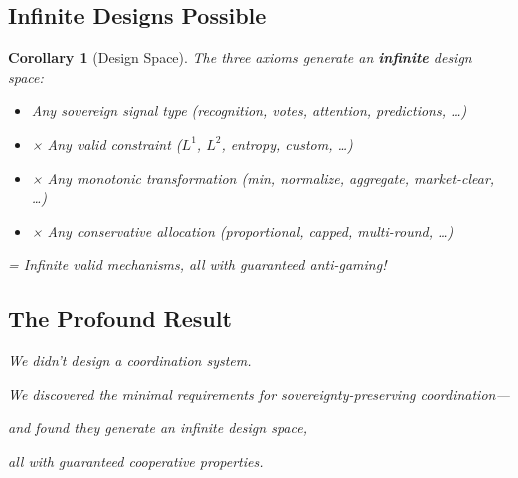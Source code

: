\documentclass[11pt,a4paper]{article}
\newtheorem{corollary}[theorem]{Corollary}
\theoremstyle{definition}
\theoremstyle{remark}
\begin{document}
\subsection{Infinite Designs Possible}

\begin{corollary}[Design Space]
The three axioms generate an \textbf{infinite} design space:
\begin{itemize}
\item Any sovereign signal type (recognition, votes, attention, predictions, …)
\item × Any valid constraint ($L^1$, $L^2$, entropy, custom, …)
\item × Any monotonic transformation (min, normalize, aggregate, market-clear, …)
\item × Any conservative allocation (proportional, capped, multi-round, …)
\end{itemize}

= Infinite valid mechanisms, all with guaranteed anti-gaming!
\end{corollary}

\subsection{The Profound Result}

\begin{center}
\Large
{}
\end{center}

\medskip

\begin{center}
\textit{We didn't design a coordination system.}

\medskip

\textit{We discovered the minimal requirements for sovereignty-preserving coordination—}

\textit{and found they generate an infinite design space,}

\textit{all with guaranteed cooperative properties.}
\end{center}
\end{document}
